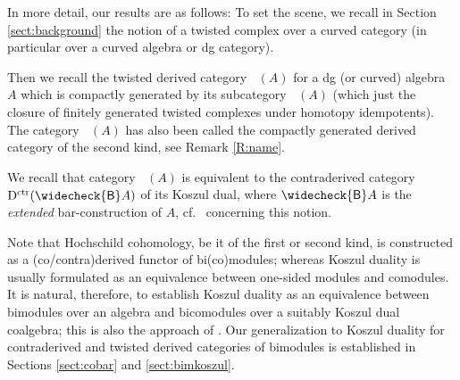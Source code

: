 \documentclass[a4paper]{amsart}
\theoremstyle{plain}
\theoremstyle{definition}
\theoremstyle{remark}
\DeclareMathOperator{\DII}{D^{{II}}}%
\DeclareMathOperator{\Dctr}{D^{ctr}}
\DeclareMathOperator{\PerfII}{Perf^{\mathrm{II}}}
\newcommand{\cB}{\widecheck{\mathsf{B}}}
\numberwithin{equation}{section}
\theoremstyle{plain}
\begin{document}
	
	In more detail, our results are as follows: To set the scene, we recall in Section  \ref{sect:background} the notion of a twisted complex over a curved category (in particular over a curved algebra or dg category).
	
	Then we recall the twisted derived category $\DII(A)$ for a dg (or curved) algebra $A$ which is compactly generated by its subcategory $\PerfII(A)$ (which just the closure of finitely generated twisted complexes under homotopy idempotents).
	The category $\DII(A)$ has also been called the compactly generated derived category of the second kind, see Remark \ref{R:name}.
	
	We recall 
	that category $\DII(A)$ is equivalent to the contraderived category $\Dctr(\cB A)$ of its Koszul dual, where $\cB A$ is the \emph{extended} bar-construction of $A$, cf.\ \cite{aj13, gl21, bl23} concerning this notion.
	
		Note that Hochschild cohomology, be it of the first or second kind, is constructed as a (co/contra)derived functor of bi(co)modules; whereas Koszul duality is usually formulated as an equivalence between one-sided modules and comodules. It is natural, therefore, to establish Koszul duality as an equivalence between bimodules over an algebra and bicomodules over a suitably Koszul dual coalgebra;  this is also the approach of \cite{kel21a}.
Our generalization to	Koszul duality for contraderived and twisted derived categories of bimodules is established in Sections \ref{sect:cobar} and \ref{sect:bimkoszul}.
%	
	
\end{document}
